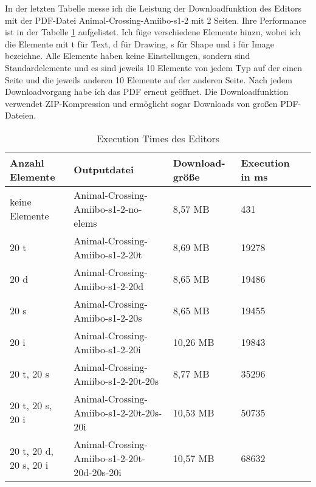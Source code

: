In der letzten Tabelle messe ich die Leistung der Downloadfunktion des Editors mit der PDF-Datei Animal-Crossing-Amiibo-s1-2 mit 2 Seiten. Ihre Performance ist in der Tabelle \ref{table:editor-dur} aufgelistet. Ich füge verschiedene Elemente hinzu, wobei ich die Elemente mit t für Text, d für Drawing, s für Shape und i für Image bezeichne. Alle Elemente haben keine Einstellungen, sondern sind Standardelemente und es sind jeweils 10 Elemente von jedem Typ auf der einen Seite und die jeweils anderen 10 Elemente auf der anderen Seite. Nach jedem Downloadvorgang habe ich das PDF erneut geöffnet. Die Downloadfunktion verwendet ZIP-Kompression und ermöglicht sogar Downloads von großen PDF-Dateien.

\begin{table}[!htbp]
	\centering
	\begin{tabular}{|p{2cm}|p{4cm}|p{2cm}|p{2cm}|p{2cm}|}
		\hline
		\textbf{Anzahl Elemente}			& \textbf{Outputdatei}							& \textbf{Download-größe}	& \textbf{Execution in ms} 	\\ 
		\hline
		keine Elemente 						& Animal-Crossing-Amiibo-s1-2-no-elems			& 8,57 MB					& 431      					\\
		20 t 								& Animal-Crossing-Amiibo-s1-2-20t				& 8,69 MB					& 19278       				\\
		20 d 								& Animal-Crossing-Amiibo-s1-2-20d				& 8,65 MB					& 19486    					\\
		20 s 								& Animal-Crossing-Amiibo-s1-2-20s				& 8,65 MB					& 19455       				\\
		20 i 								& Animal-Crossing-Amiibo-s1-2-20i				& 10,26 MB					& 19843      				\\
		20 t, 20 s 							& Animal-Crossing-Amiibo-s1-2-20t-20s			& 8,77 MB					& 35296      				\\
		20 t, 20 s, 20 i 					& Animal-Crossing-Amiibo-s1-2-20t-20s-20i		& 10,53 MB					& 50735      				\\
		20 t, 20 d, 20 s, 20 i 				& Animal-Crossing-Amiibo-s1-2-20t-20d-20s-20i	& 10,57 MB					& 68632    					\\
		\hline
	\end{tabular}
	\caption{Execution Times des Editors}
	\label{table:editor-dur}
\end{table}